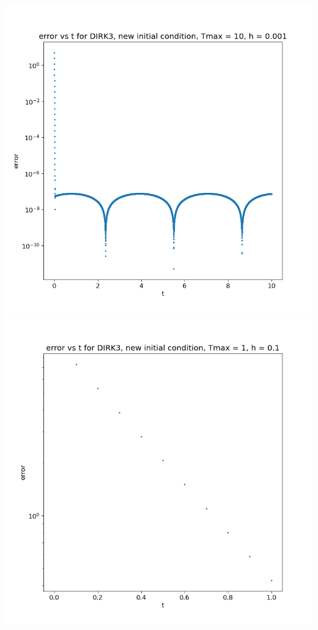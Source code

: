 \documentclass{article}
\begin{document}
\begin{enumerate}
\begin{enumerate}[label=(\alph*)]
\begin{center}
		\includegraphics[scale=.3]{hw3 dirk3 err vs t graph 3}
		\includegraphics[scale=.3]{hw3 dirk3 err vs t graph 4}

\end{center}
\end{enumerate}
\end{enumerate}
\end{document}
